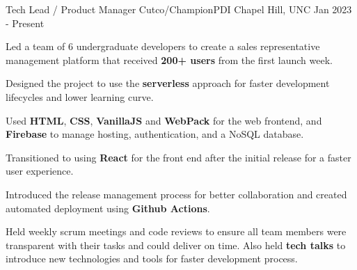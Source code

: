 
\begin{cventries}
  \cventry
    {Tech Lead / Product Manager} %
    {Cutco/ChampionPDI} %
    {Chapel Hill, UNC} %
    {Jan 2023 - Present} %
    {
      \begin{cvitems} %
        \item {Led a team of 6 undergraduate developers to create a sales representative management platform that received \textbf{200+ users} from the first launch week.}
        \item {Designed the project to use the \textbf{serverless} approach for faster development lifecycles and lower learning curve.}
        \item {Used \textbf{HTML}, \textbf{CSS}, \textbf{VanillaJS} and \textbf{WebPack} for the web frontend, and \textbf{Firebase} to manage hosting, authentication, and a NoSQL database.}
        \item {Transitioned to using \textbf{React} for the front end after the initial release for a faster user experience.}
        \item {Introduced the release management process for better collaboration and created automated deployment using \textbf{Github Actions}.}
        \item {Held weekly scrum meetings and code reviews to ensure all team members were transparent with their tasks and could deliver on time. Also held \textbf{tech talks} to introduce new technologies and tools for faster development process.}
      \end{cvitems}
    }


\end{cventries}
